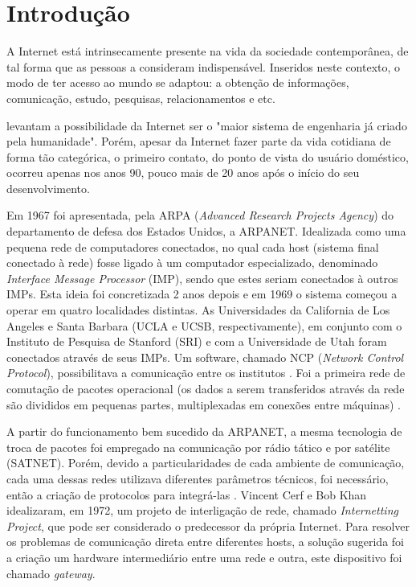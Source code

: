 
\chapter{Introdução}
\label{chap:introducao}

A Internet está intrinsecamente presente na vida da sociedade contemporânea, de tal forma que as pessoas a consideram indispensável. Inseridos neste contexto, o modo de ter acesso ao mundo se adaptou: a obtenção de informações, comunicação, estudo, pesquisas, relacionamentos e etc. 

 levantam a possibilidade da Internet ser o "maior sistema de engenharia já criado pela humanidade". Porém, apesar da Internet fazer parte da vida cotidiana de forma tão categórica, o primeiro contato, do ponto de vista do usuário doméstico, ocorreu apenas nos anos 90, pouco mais de 20 anos após o início do seu desenvolvimento.

Em 1967 foi apresentada, pela ARPA (\textit{Advanced Research Projects Agency}) do departamento de defesa dos Estados Unidos, a ARPANET. Idealizada como uma pequena rede de computadores conectados, no qual cada host (sistema final conectado à rede) fosse ligado à um computador especializado, denominado \textit{Interface Message Processor} (IMP), sendo que estes seriam conectados à outros IMPs. Esta ideia foi concretizada 2 anos depois e em 1969 o sistema começou a operar em quatro localidades distintas. As	 Universidades da California de Los Angeles e Santa Barbara (UCLA e UCSB, respectivamente), em conjunto com o Instituto de Pesquisa de Stanford (SRI) e com a Universidade de Utah foram conectados através de seus IMPs. Um software, chamado NCP (\textit{Network Control Protocol}), possibilitava a comunicação entre os institutos \cite{FOR}. Foi a primeira rede de comutação de pacotes operacional (os dados a serem transferidos através da rede são divididos em pequenas partes, multiplexadas em conexões entre máquinas) \cite{COMER}.

A partir do funcionamento bem sucedido da ARPANET, a mesma tecnologia de troca de pacotes foi empregado na comunicação por rádio tático e por satélite (SATNET). Porém, devido a particularidades de cada ambiente de comunicação, cada uma dessas redes utilizava diferentes parâmetros técnicos, foi necessário, ent\~ao a criação de protocolos para integrá-las \cite{STALLINGS}. Vincent Cerf e Bob Khan idealizaram, em 1972, um projeto de interligação de rede, chamado \textit{Internetting Project}, que pode ser considerado o predecessor da própria Internet. Para resolver os problemas de comunicação direta entre diferentes hosts, a solução sugerida foi a criação um hardware intermediário entre uma rede e outra, este dispositivo foi chamado \textit{gateway}.

